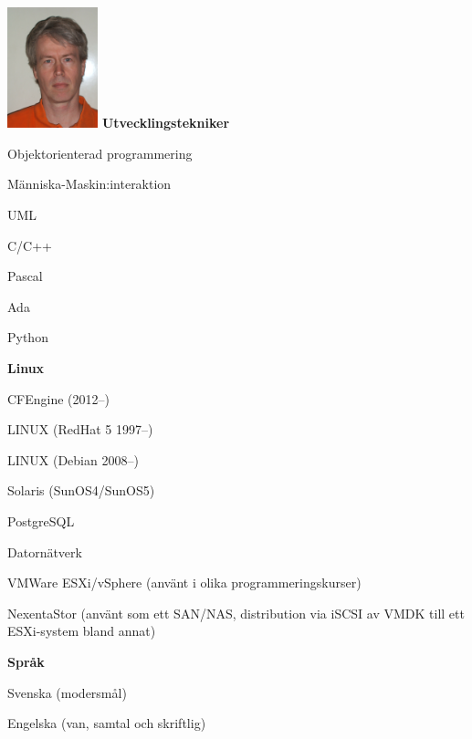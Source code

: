 \documentclass[a4paper,swedish,10pt]{article}
\begin{document}
\begin{minipage}[t]{0.24\textwidth}%
  \raggedleft%
  \vspace{-\topskip+1cm}
  \includegraphics[height=3.5cm]{idbild.jpg}
  \textbf{Utvecklingstekniker}
  \begin{description}[nosep]
    \raggedleft\setlength\itemsep{0.1ex}\small%
  \item Objektorienterad programmering
  \item Människa-Maskin:interaktion
  \item UML
  \item C/C++
  \item Pascal
  \item Ada
  \item Python
  \end{description}
  \vspace{0.5cm}
  \textbf{Linux}
  \begin{description}[nosep,font=\sffamily\bfseries]
    \raggedleft\setlength\itemsep{0.1ex}\small%
  \item CFEngine (2012--)
  \item LINUX (RedHat 5 1997--)
  \item LINUX (Debian 2008--)
  \item Solaris (SunOS4/SunOS5)
  \item PostgreSQL
  \item Datornätverk
  \item VMWare ESXi/vSphere (använt i olika programmeringskurser)
  \item NexentaStor (använt som ett SAN/NAS, distribution via iSCSI av VMDK till ett ESXi-system bland annat)
  \end{description}
  \vspace{0.5cm}
  \textbf{Språk}
  \begin{description}[nosep,itemsep=0.1ex]
    \raggedleft\small%
  \item Svenska (modersmål)
  \item Engelska (van, samtal och skriftlig)
  \end{description}
\end{minipage}
\end{document}
